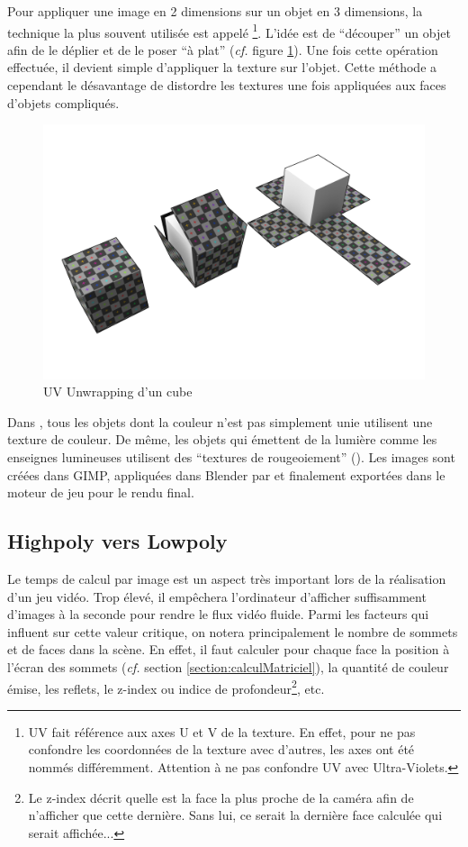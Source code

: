Pour appliquer une image en 2 dimensions sur un objet en 3 dimensions, la technique la plus souvent utilisée est appelé \footnote{UV fait référence aux axes U et V de la texture. En effet, pour ne pas confondre les coordonnées de la texture avec d'autres, les axes ont été nommés différemment. Attention à ne pas confondre UV avec Ultra-Violets.}. L'idée est de \enquote{découper} un objet afin de le déplier et de le poser \enquote{à plat} (\textit{cf.} figure \ref{fig:uvUnwrap}). Une fois cette opération effectuée, il devient simple d'appliquer la texture sur l'objet. Cette méthode a cependant le désavantage de distordre les textures une fois appliquées aux faces d'objets compliqués.

\begin{figure}[th!]
	\center
	\includegraphics[width=.5\textwidth]{images/Technique/uvUnwrap.png}
	\caption{\label{fig:uvUnwrap}UV Unwrapping d'un cube {\cite{CubeRepresentativeUVUnwrapping_}}}
\end{figure}

Dans \nomJeu, tous les objets dont la couleur n'est pas simplement unie utilisent une texture de couleur. De même, les objets qui émettent de la lumière comme les enseignes lumineuses utilisent des \enquote{textures de rougeoiement} (). Les images sont créées dans GIMP, appliquées dans Blender par  et finalement exportées dans le moteur de jeu pour le rendu final.



\subsection{Highpoly vers Lowpoly}
\label{sec:highpolyVersLowpoly}
Le temps de calcul par image est un aspect très important lors de la réalisation d'un jeu vidéo. Trop élevé, il empêchera l'ordinateur d'afficher suffisamment d'images à la seconde pour rendre le flux vidéo fluide. Parmi les facteurs qui influent sur cette valeur critique, on notera principalement le nombre de sommets et de faces dans la scène. En effet, il faut calculer pour chaque face la position à l'écran des sommets (\textit{cf.} section \ref{section:calculMatriciel}), la quantité de couleur émise, les reflets, le z-index ou indice de profondeur\footnote{Le z-index décrit quelle est la face la plus proche de la caméra afin de n'afficher que cette dernière. Sans lui, ce serait la dernière face calculée qui serait affichée...}, etc.


